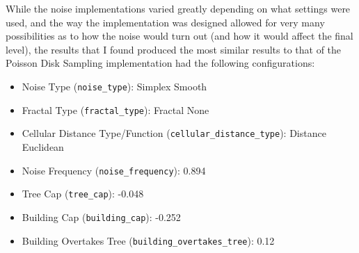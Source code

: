While the noise implementations varied greatly depending on what settings were used, and the way the implementation was designed allowed for very many possibilities as to how the noise would turn out (and how it would affect the final level), the results that I found produced the most similar results to that of the Poisson Disk Sampling implementation had the following configurations:

\begin{itemize}
    \item Noise Type (\verb|noise_type|): Simplex Smooth
    \item Fractal Type (\verb|fractal_type|): Fractal None
    \item Cellular Distance Type/Function (\verb|cellular_distance_type|): Distance Euclidean
    \item Noise Frequency (\verb|noise_frequency|): 0.894
    \item Tree Cap (\verb|tree_cap|): -0.048
    \item Building Cap (\verb|building_cap|): -0.252
    \item Building Overtakes Tree (\verb|building_overtakes_tree|): 0.12
\end{itemize}